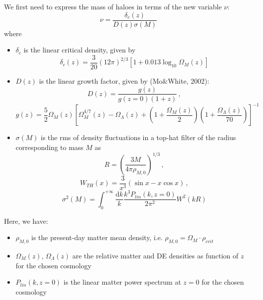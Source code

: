\documentclass[10pt,a4paper]{article}
\begin{document}
We first need to express the mass of haloes in terms of the new variable $\nu$:
\begin{equation}
\nu = \frac{\delta_c(z)}{D(z)\sigma(M)}
\end{equation}
where
\begin{itemize}
\item $\delta_c$ is the linear critical density, given by
\begin{equation}
\delta_c(z) = \frac{3}{20} \left(12\pi\right)^{2/3} \left[ 1 + 0.013 \log_{10} \Omega_M(z)\right]
\end{equation}
\item $D(z)$ is the linear growth factor, given by (Mo\&White, 2002):
\begin{equation}
D(z) = \frac{g(z)}{g(z=0)(1+z)} \, ,
\end{equation}
\begin{equation}
g(z) = \frac{5}{2}\Omega_M(z) \left[ \Omega_M^{4/7}(z) - \Omega_{\Lambda}(z) + \left(1 + \frac{\Omega_M(z)}{2}\right)\left(1 + \frac{\Omega_{\Lambda}(z)}{70}\right)\right]^{-1}
\end{equation}
\item $\sigma(M)$ is the rms of density fluctuations in a top-hat filter of the radius corresponding to mass $M$ as
\begin{equation}
R = \left(\frac{3M}{4\pi \rho_{M,0}}\right)^{1/3} \, ,
\end{equation}
\begin{equation}
W_{TH}(x) = \frac{3}{x^3} \left( \sin x - x \cos x \right) \, ,
\end{equation}
\begin{equation}
\sigma^2(M) = \int_0^{+\infty} \frac{\mathrm{d}k}{k} \frac{k^3 P_{lin}(k, z=0)}{2\pi^2} W^2(kR)
\end{equation}
\end{itemize}

Here, we have:
\begin{itemize}
\item $\rho_{M,0}$ is the present-day matter mean density, i.e. $\rho_{M,0} = \Omega_M \cdot \rho_{crit}$
\item $\Omega_M(z)$, $\Omega_{\Lambda}(z)$ are the relative matter and DE densities as function of $z$ for the chosen cosmology
\item $P_{lin}(k, z=0)$ is the linear matter power spectrum at $z=0$ for the chosen cosmology
\end{itemize}
\end{document}
